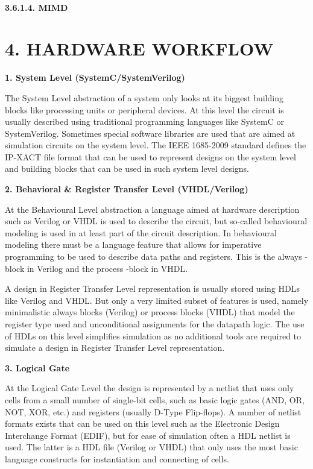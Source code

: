 \documentclass[]{article}
\let\oldparagraph\paragraph
\renewcommand{\paragraph}[1]{\oldparagraph{#1}\mbox{}}
\begin{document}
\paragraph{3.6.1.4. MIMD}\label{mimd}

\section{4. HARDWARE WORKFLOW}\label{hardware-workflow}

\textbf{1. System Level (SystemC/SystemVerilog)}

The System Level abstraction of a system only looks at its biggest
building blocks like processing units or peripheral devices. At this
level the circuit is usually described using traditional programming
languages like SystemC or SystemVerilog. Sometimes special software
libraries are used that are aimed at simulation circuits on the system
level. The IEEE 1685-2009 standard defines the IP-XACT file format that
can be used to represent designs on the system level and building blocks
that can be used in such system level designs.

\textbf{2. Behavioral \& Register Transfer Level (VHDL/Verilog)}

At the Behavioural Level abstraction a language aimed at hardware
description such as Verilog or VHDL is used to describe the circuit, but
so-called behavioural modeling is used in at least part of the circuit
description. In behavioural modeling there must be a language feature
that allows for imperative programming to be used to describe data paths
and registers. This is the always -block in Verilog and the process
-block in VHDL.

A design in Register Transfer Level representation is usually stored
using HDLs like Verilog and VHDL. But only a very limited subset of
features is used, namely minimalistic always blocks (Verilog) or process
blocks (VHDL) that model the register type used and unconditional
assignments for the datapath logic. The use of HDLs on this level
simplifies simulation as no additional tools are required to simulate a
design in Register Transfer Level representation.

\textbf{3. Logical Gate}

At the Logical Gate Level the design is represented by a netlist that
uses only cells from a small number of single-bit cells, such as basic
logic gates (AND, OR, NOT, XOR, etc.) and registers (usually D-Type
Flip-flops). A number of netlist formats exists that can be used on this
level such as the Electronic Design Interchange Format (EDIF), but for
ease of simulation often a HDL netlist is used. The latter is a HDL file
(Verilog or VHDL) that only uses the most basic language constructs for
instantiation and connecting of cells.
\end{document}
